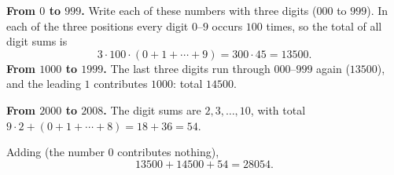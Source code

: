 \textbf{From $0$ to $999$.} Write each of these numbers with three digits ($000$ to $999$). In each of the three positions every digit $0$--$9$ occurs $100$ times, so the total of all digit sums is
\[
3\cdot100\cdot(0+1+\cdots+9)=300\cdot45=13500 .
\]
\textbf{From $1000$ to $1999$.} The last three digits run through $000$--$999$ again ($13500$), and the leading $1$ contributes $1000$: total $14500$.

\textbf{From $2000$ to $2008$.} The digit sums are $2,3,\dots,10$, with total $9\cdot2+(0+1+\cdots+8)=18+36=54$.

Adding (the number $0$ contributes nothing),
\[
13500+14500+54=\boxed{28054}.
\]
